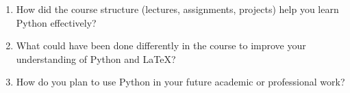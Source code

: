 \documentclass[11pt]{article}
\begin{document}
\begin{enumerate}[{$\qquad 1.]

\item How did the course structure (lectures, assignments, projects) help you learn Python effectively?\vfill


\item What could have been done differently in the course to improve your understanding of Python and \LaTeX?\vfill

\item How do you plan to use Python in your future academic or professional work?




\end{enumerate}
\end{document}
